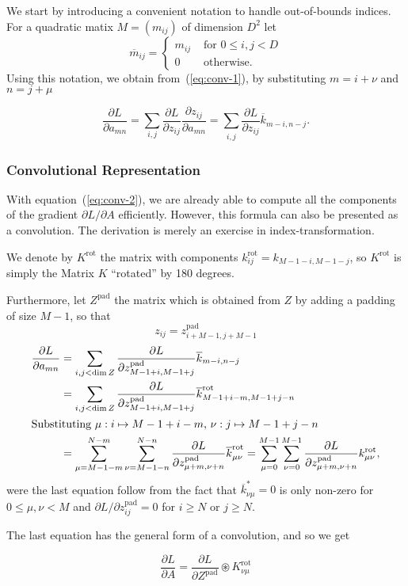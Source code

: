 \documentclass[a4paper,10pt]{article}
\begin{document}
\def\npad#1{\overline{#1}}
\def\rot#1{#1^\text{rot}}
\def\pad#1{#1^\text{pad}}
\def\lz#1{lz_{#1}}

We start by introducing a convenient notation to handle 
out-of-bounds indices. 
For a quadratic matix $M=(m_{ij})$ of dimension $D^2$ let 
\[
\npad m_{ij} = 
\left\{ 
    \begin{array}{ll}
        m_{ij} &\text{ for } 0 \le i,j < D \\
        0 &\text{ otherwise}.
    \end{array}
\right.
\]
Using this notation, we obtain from~(\ref{eq:conv-1}), 
by substituting $m=i + \nu$ and $n = j + \mu$

\begin{equation}
    \label{eq:conv-2}
    \boxed{
        \frac{\partial L}{\partial a_{mn}} = \sum_{i,j}
        \frac{\partial L}{\partial z_{ij}} \frac{\partial z_{ij}}{\partial a_{mn}}      
        = \sum_{\substack{i,j}}
        \frac{\partial L}{\partial z_{ij}} \npad k_{m-i, n-j}.
    }
\end{equation}

\subsubsection*{Convolutional Representation}

With equation~(\ref{eq:conv-2}), we are already able to compute 
all the components of the gradient $\partial L / \partial A$ efficiently. 
However, this formula can also be presented as a convolution. 
The derivation is merely an exercise in index-transformation.   

We denote by $\rot K$ the matrix with components $\rot k_{ij} = k_{M-1-i, M-1-j}$, 
so $\rot K$ is simply the Matrix $K$ ``rotated'' by 180 degrees. 


Furthermore, let $\pad{Z}$ the matrix which is obtained from $Z$ by 
adding a padding of size $M-1$, so that 
\[
    z_{ij} = \pad z_{i+M-1, j+M-1}
\]
\begin{align*}
    \frac{\partial L}{\partial a_{mn}} &= 
    \sum_{i,j < \dim Z}
    \frac{\partial L}{\partial \pad z_{M-1+i,M-1+j}} \npad k_{m-i, n-j} \\
    &= \sum_{i,j < \dim Z}
    \frac{\partial L}{\partial \pad z_{M-1+i, M-1+j}}
    \rot {\npad k}_{M-1+i-m, M-1+j-n} \\
    \intertext{Substituting $\mu:  i\mapsto M-1+i-m$, $\nu: j \mapsto M-1+j-n$} 
    &= \sum_{\mu = M-1-m}^{N-m} \sum_{\nu = M-1-n}^{N-n} 
    \frac{\partial L}{\partial \pad z_{\mu + m, \nu + n}} \rot {\npad k}_{\mu \nu} = 
    \sum_{\mu = 0}^{M-1}\sum_{\nu = 0}^{M-1} 
    \frac{\partial L}{\partial \pad z_{\mu + m, \nu + n}} \rot k_{\mu \nu},
\end{align*}
were the last equation follow from the fact that 
$\npad k^*_{\nu \mu} = 0$ is only non-zero for $0\le \mu, \nu < M$ and 
$\partial L / \partial \pad z_{ij} =0$ for $i \ge N$ or $j \ge N$. 

The last equation has the general form of a convolution, and so we get

\begin{equation}
    \boxed{
    \frac{\partial L}{\partial A} = \frac{\partial L}{\partial \pad Z} \circledast \rot K_{\nu \mu}
    }
\end{equation}
\end{document}
